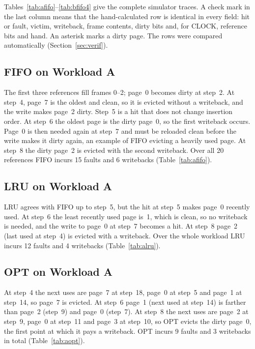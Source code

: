 \documentclass[conference,a4paper]{IEEEtran}
\begin{document}
Tables~\ref{tab:afifo}--\ref{tab:bfifo4} give the complete simulator traces. A check mark in the last column means that the hand-calculated row is identical in every field: hit or fault, victim, writeback, frame contents, dirty bits and, for CLOCK, reference bits and hand. An asterisk marks a dirty page. The rows were compared automatically (Section~\ref{sec:verif}).




\subsection{FIFO on Workload A}
The first three references fill frames 0--2; page~0 becomes dirty at step~2. At step~4, page~7 is the oldest and clean, so it is evicted without a writeback, and the write makes page~2 dirty. Step~5 is a hit that does not change insertion order. At step~6 the oldest page is the dirty page~0, so the first writeback occurs. Page~0 is then needed again at step~7 and must be reloaded clean before the write makes it dirty again, an example of FIFO evicting a heavily used page. At step~8 the dirty page~2 is evicted with the second writeback. Over all 20 references FIFO incurs 15 faults and 6 writebacks (Table~\ref{tab:afifo}).

\subsection{LRU on Workload A}
LRU agrees with FIFO up to step~5, but the hit at step~5 makes page~0 recently used. At step~6 the least recently used page is~1, which is clean, so no writeback is needed, and the write to page~0 at step~7 becomes a hit. At step~8 page~2 (last used at step~4) is evicted with a writeback. Over the whole workload LRU incurs 12 faults and 4 writebacks (Table~\ref{tab:alru}).




\subsection{OPT on Workload A}
At step~4 the next uses are page~7 at step~18, page~0 at step~5 and page~1 at step~14, so page~7 is evicted. At step~6 page~1 (next used at step~14) is farther than page~2 (step~9) and page~0 (step~7). At step~8 the next uses are page~2 at step~9, page~0 at step~11 and page~3 at step~10, so OPT evicts the dirty page~0, the first point at which it pays a writeback. OPT incurs 9 faults and 3 writebacks in total (Table~\ref{tab:aopt}).
\end{document}
